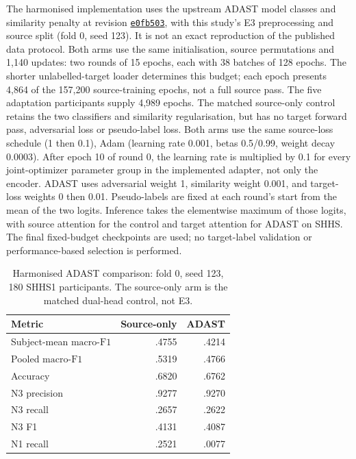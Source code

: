 \documentclass[10pt,a4paper]{article}
\newcommand{\mf}{\ensuremath{\mathrm{macro\text{-}F1}}}
\begin{document}
The harmonised implementation uses the upstream ADAST model classes and similarity penalty
at revision \href{https://github.com/emadeldeen24/ADAST/commit/e0fb503544ddd38f71027c09e3401b900f3dabc3}{\texttt{e0fb503}}, with this study's E3 preprocessing
and source split (fold 0, seed 123). It is not an exact reproduction of the published data protocol.
Both arms use the same initialisation, source permutations and 1,140 updates: two rounds of
15 epochs, each with 38 batches of 128 epochs. The shorter unlabelled-target loader determines
this budget; each epoch presents 4,864 of the 157,200 source-training epochs, not a full source pass.
The five adaptation participants supply 4,989 epochs. The matched source-only control retains
the two classifiers and similarity regularisation, but has no target forward pass, adversarial
loss or pseudo-label loss. Both arms use the same source-loss schedule (1 then 0.1), Adam
(learning rate 0.001, betas 0.5/0.99, weight decay 0.0003). After epoch 10 of round 0,
the learning rate is multiplied by 0.1 for every joint-optimizer parameter group in the
implemented adapter, not only the encoder.
ADAST uses adversarial weight 1, similarity weight 0.001, and target-loss weights 0 then 0.01.
Pseudo-labels are fixed at each round's start from the mean of the two logits. Inference takes
the elementwise maximum of those logits, with source attention for the control and target
attention for ADAST on SHHS. The final fixed-budget checkpoints are used; no target-label
validation or performance-based selection is performed.

\begin{table}[H]
\centering\small
\caption{Harmonised ADAST comparison: fold 0, seed 123, 180 SHHS1 participants.
The source-only arm is the matched dual-head control, not E3.}
\label{tab:sup_adast_pilot}
\begin{tabular}{lrr}
\toprule
Metric & Source-only & ADAST \\
\midrule
Subject-mean \mf & .4755 & .4214 \\
Pooled \mf & .5319 & .4766 \\
Accuracy & .6820 & .6762 \\
N3 precision & .9277 & .9270 \\
N3 recall & .2657 & .2622 \\
N3 F1 & .4131 & .4087 \\
N1 recall & .2521 & .0077 \\
\bottomrule
\end{tabular}
\end{table}
\end{document}
